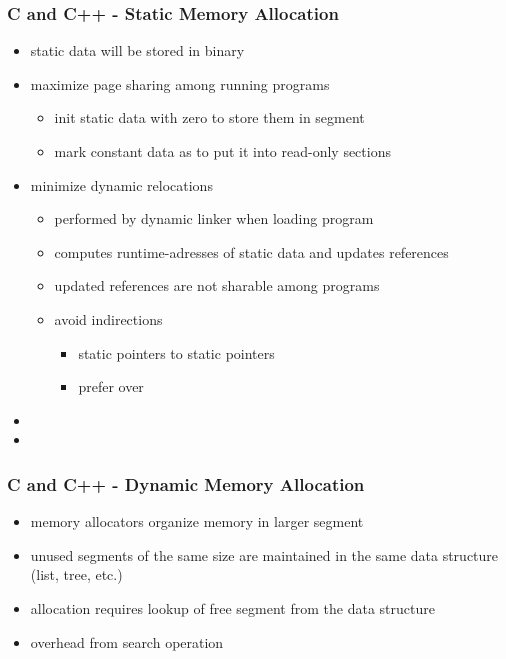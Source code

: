 \begin{frame}
 \frametitle{C and C++ - Static Memory Allocation}
 \begin{itemize}
  \item static data will be stored in binary
  \item maximize page sharing among running programs
  \begin{itemize}
   \item init static data with zero to store them in  segment
   \item mark constant data as  to put it into read-only sections
  \end{itemize}
  \item minimize dynamic relocations
  \begin{itemize}
   \item performed by dynamic linker when loading program
   \item computes runtime-adresses of static data and updates references
   \item updated references are not sharable among programs
   \item avoid indirections
    \begin{itemize}
     \item static pointers to static pointers
     \item prefer  over 
    \end{itemize}
  \end{itemize}
  \item {}
  \item {}
 \end{itemize}
\end{frame}

\begin{frame}
 \frametitle{C and C++ - Dynamic Memory Allocation}
 \begin{itemize}
  \item memory allocators organize memory in larger segment
  \item unused segments of the same size are maintained in the same data structure (list, tree, etc.)
  \item allocation requires lookup of free segment from the data structure
  \item overhead from search operation
 \end{itemize}
\end{frame}


